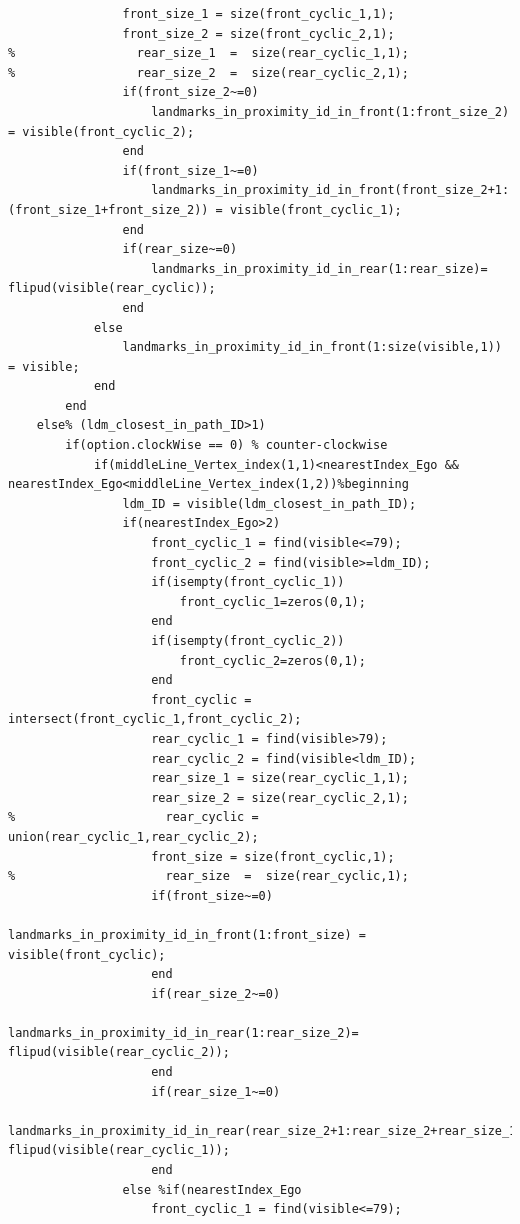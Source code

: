 \documentclass[12pt,a4paper]{article}
\begin{document}
{{{\begin{verbatim}
                front_size_1 = size(front_cyclic_1,1);
                front_size_2 = size(front_cyclic_2,1);
%                 rear_size_1  =  size(rear_cyclic_1,1);
%                 rear_size_2  =  size(rear_cyclic_2,1);
                if(front_size_2~=0)
                    landmarks_in_proximity_id_in_front(1:front_size_2) = visible(front_cyclic_2);
                end
                if(front_size_1~=0)
                    landmarks_in_proximity_id_in_front(front_size_2+1:(front_size_1+front_size_2)) = visible(front_cyclic_1);
                end
                if(rear_size~=0)
                    landmarks_in_proximity_id_in_rear(1:rear_size)= flipud(visible(rear_cyclic));               
                end
            else
                landmarks_in_proximity_id_in_front(1:size(visible,1)) = visible;
            end
        end
    else% (ldm_closest_in_path_ID>1)
        if(option.clockWise == 0) % counter-clockwise
            if(middleLine_Vertex_index(1,1)<nearestIndex_Ego && nearestIndex_Ego<middleLine_Vertex_index(1,2))%beginning
                ldm_ID = visible(ldm_closest_in_path_ID);
                if(nearestIndex_Ego>2)
                    front_cyclic_1 = find(visible<=79);
                    front_cyclic_2 = find(visible>=ldm_ID);
                    if(isempty(front_cyclic_1))
                        front_cyclic_1=zeros(0,1);
                    end
                    if(isempty(front_cyclic_2))
                        front_cyclic_2=zeros(0,1);
                    end                    
                    front_cyclic = intersect(front_cyclic_1,front_cyclic_2);
                    rear_cyclic_1 = find(visible>79);
                    rear_cyclic_2 = find(visible<ldm_ID);
                    rear_size_1 = size(rear_cyclic_1,1);
                    rear_size_2 = size(rear_cyclic_2,1);
%                     rear_cyclic = union(rear_cyclic_1,rear_cyclic_2);
                    front_size = size(front_cyclic,1);
%                     rear_size  =  size(rear_cyclic,1);
                    if(front_size~=0)
                        landmarks_in_proximity_id_in_front(1:front_size) = visible(front_cyclic);
                    end
                    if(rear_size_2~=0)
                        landmarks_in_proximity_id_in_rear(1:rear_size_2)= flipud(visible(rear_cyclic_2));
                    end
                    if(rear_size_1~=0)
                        landmarks_in_proximity_id_in_rear(rear_size_2+1:rear_size_2+rear_size_1)= flipud(visible(rear_cyclic_1));
                    end
                else %if(nearestIndex_Ego
                    front_cyclic_1 = find(visible<=79);

\end{verbatim}}}}
\end{document}
